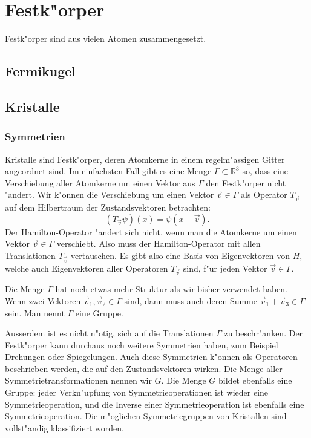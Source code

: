 \chapter{Festk"orper\label{chapter:festkoerper}}
\rhead{}
Festk"orper sind aus vielen Atomen zusammengesetzt. 
\section{Fermikugel}

\section{Kristalle}
\subsection{Symmetrien}
Kristalle sind Festk"orper, deren Atomkerne in einem regelm"assigen
Gitter angeordnet sind.
Im einfachsten Fall gibt es eine Menge 
$ \Gamma  \subset \mathbb R^3 $
so, dass eine Verschiebung aller Atomkerne um einen Vektor aus $\Gamma$
den Festk"orper nicht "andert.
Wir k"onnen die Verschiebung um einen Vektor $\vec v\in\Gamma$ als
Operator $T_{\vec v}$ auf dem Hilbertraum der Zustandsvektoren
betrachten:
\[
(T_{\vec v}\psi)(x)=\psi(x-\vec v).
\]
Der Hamilton-Operator "andert sich nicht, wenn man die Atomkerne um
einen Vektor $\vec v\in\Gamma$ verschiebt.
Also muss der Hamilton-Operator mit allen Translationen $T_{\vec v}$ 
vertauschen.
Es gibt also eine Basis von Eigenvektoren von $H$, welche auch
Eigenvektoren aller Operatoren $T_{\vec v}$ sind, f"ur jeden Vektor
$\vec v\in\Gamma$.

Die Menge $\Gamma$ hat noch etwas mehr Struktur als wir bisher
verwendet haben.
Wenn zwei Vektoren $\vec v_1,\vec v_2\in\Gamma$ sind, dann muss
auch deren Summe $\vec v_1+\vec v_3\in\Gamma$ sein.
Man nennt $\Gamma$ eine Gruppe.

Ausserdem ist es nicht n"otig, sich auf die Translationen $\Gamma$
zu beschr"anken.
Der Festk"orper kann durchaus noch weitere Symmetrien haben, zum
Beispiel Drehungen oder Spiegelungen.
Auch diese Symmetrien k"onnen als Operatoren beschrieben
werden, die auf den Zustandsvektoren wirken.
Die Menge aller Symmetrietransformationen nennen wir $G$.
Die Menge $G$ bildet ebenfalls eine Gruppe: jeder Verkn"upfung von
Symmetrieoperationen ist wieder eine Symmetrieoperation, und die
Inverse einer Symmetrieoperation ist ebenfalls eine Symmetrieoperation.
Die m"oglichen Symmetriegruppen von Kristallen sind vollst"andig
klassifiziert worden.

